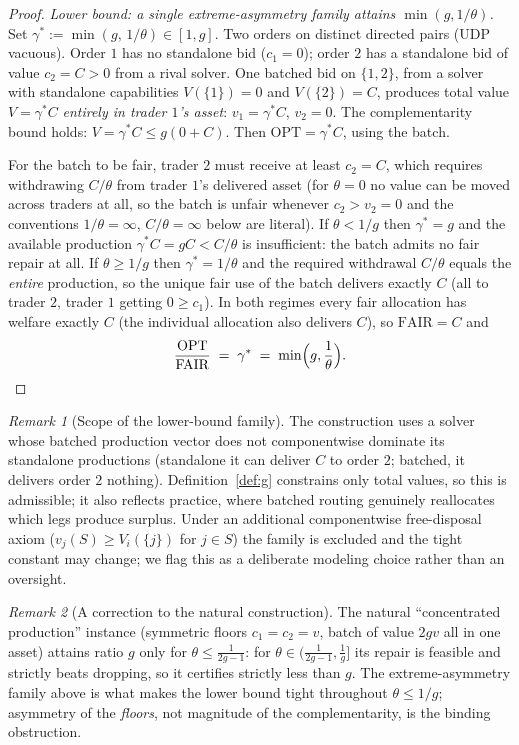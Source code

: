 \documentclass[11pt]{article}
\theoremstyle{remark}
\newtheorem{remark}{Remark}
\newcommand{\OPT}{\mathrm{OPT}}
\newcommand{\FAIR}{\mathrm{FAIR}}
\begin{document}
\begin{proof}
\emph{Lower bound: a single extreme-asymmetry family attains
$\min(g,1/\theta)$.}
Set $\gamma^\ast:=\min(g,\,1/\theta)\in[1,g]$. Two orders on distinct
directed pairs (UDP vacuous). Order $1$ has no standalone bid ($c_1=0$);
order $2$ has a standalone bid of value $c_2=C>0$ from a rival solver. One
batched bid on $\{1,2\}$, from a solver with standalone capabilities
$V(\{1\})=0$ and $V(\{2\})=C$, produces total value $V=\gamma^\ast C$
\emph{entirely in trader $1$'s asset}: $v_1=\gamma^\ast C$, $v_2=0$. The
complementarity bound holds: $V=\gamma^\ast C\le g(0+C)$. Then
$\OPT=\gamma^\ast C$, using the batch.

For the batch to be fair, trader $2$ must receive at least $c_2=C$, which
requires withdrawing $C/\theta$ from trader $1$'s delivered asset (for
$\theta=0$ no value can be moved across traders at all, so the batch is
unfair whenever $c_2>v_2=0$ and the conventions $1/\theta=\infty$,
$C/\theta=\infty$ below are literal). If
$\theta<1/g$ then $\gamma^\ast=g$ and the available production
$\gamma^\ast C=gC<C/\theta$ is insufficient: the batch admits no fair
repair at all. If $\theta\ge1/g$ then $\gamma^\ast=1/\theta$ and the
required withdrawal $C/\theta$ equals the \emph{entire} production, so the
unique fair use of the batch delivers exactly $C$ (all to trader $2$,
trader $1$ getting $0\ge c_1$). In both regimes every fair allocation has
welfare exactly $C$ (the individual allocation also delivers $C$), so
$\FAIR=C$ and
\[
\frac{\OPT}{\FAIR}\;=\;\gamma^\ast\;=\;\min\!\Big(g,\frac1\theta\Big).
\qedhere
\]
\end{proof}

\begin{remark}[Scope of the lower-bound family]\label{rem:nodominance}
The construction uses a solver whose batched production vector does not
componentwise dominate its standalone productions (standalone it can
deliver $C$ to order $2$; batched, it delivers order $2$ nothing).
Definition~\ref{def:g} constrains only total values, so this is admissible;
it also reflects practice, where batched routing genuinely reallocates
which legs produce surplus. Under an additional componentwise
free-disposal axiom ($v_j(S)\ge V_i(\{j\})$ for $j\in S$) the family is
excluded and the tight constant may change; we flag this as a deliberate
modeling choice rather than an oversight.
\end{remark}

\begin{remark}[A correction to the natural construction]
\label{rem:concentration}
The natural ``concentrated production'' instance (symmetric floors
$c_1=c_2=v$, batch of value $2gv$ all in one asset) attains ratio $g$ only
for $\theta\le\frac{1}{2g-1}$: for $\theta\in(\frac{1}{2g-1},\frac1g]$ its
repair is feasible and strictly beats dropping, so it certifies strictly
less than $g$. The extreme-asymmetry family above is what makes the lower
bound tight throughout $\theta\le1/g$; asymmetry of the \emph{floors}, not
magnitude of the complementarity, is the binding obstruction.
\end{remark}
\end{document}
